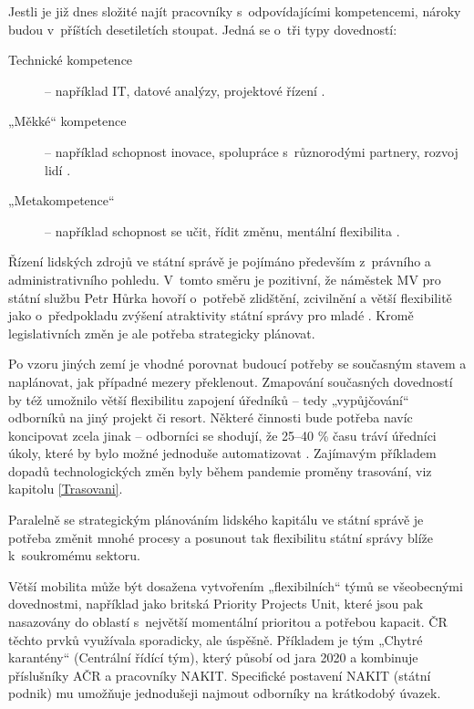 Jestli je již dnes složité najít pracovníky s~odpovídajícími kompetencemi, nároky budou v~příštích desetiletích stoupat. Jedná se o~tři typy dovedností:
\begin{description}
  \item[Technické kompetence] -- například IT, datové
analýzy, projektové řízení \cite{thomas_finding_2021, hlidac_nedigitalni_2021}.
  \item[„Měkké“ kompetence] -- například schopnost inovace, spolupráce
s~různorodými partnery, rozvoj lidí \cite{oecd_public_governance_reviews_skills_2020}.
  \item[„Metakompetence“] -- například schopnost se učit, řídit změnu, mentální flexibilita \cite{dondi_future-citizen_2020}.
\end{description}
Řízení lidských zdrojů ve státní správě je pojímáno především z~právního a administrativního pohledu. V~tomto směru je pozitivní, že náměstek MV pro státní službu Petr Hůrka \cite{plihalova_z_2020} hovoří o~potřebě zlidštění, zcivilnění a větší flexibilitě jako o~předpokladu zvýšení atraktivity státní správy pro mladé \cite{mpo2021}. Kromě legislativních změn je ale potřeba strategicky plánovat.

Po vzoru jiných zemí \cite{thomas_finding_2021, ministere_gestion_2015} je vhodné porovnat budoucí potřeby se současným stavem a naplánovat, jak případné mezery překlenout. Zmapování současných dovedností by též umožnilo větší flexibilitu zapojení úředníků -- tedy „vypůjčování“ odborníků na jiný projekt či resort. Některé činnosti bude potřeba navíc koncipovat zcela jinak -- odborníci se shodují, že 25--40 \% času tráví úředníci úkoly, které by bylo možné jednoduše automatizovat \cite{department_of_the_prime_minister_and_cabinet_our_2019, deloitte_augmented_2017}. Zajímavým příkladem dopadů technologických změn byly během pandemie proměny trasování, viz kapitolu \ref{Trasovani}.

Paralelně se strategickým plánováním lidského kapitálu ve státní správě je po\-tře\-ba změnit mnohé procesy a posunout tak flexibilitu státní správy blíže k~soukromému sektoru.

Větší mobilita může být dosažena vytvořením „flexibilních“ týmů se všeobecnými dovednostmi, například jako britská Priority Projects Unit, které jsou pak nasazovány do oblastí s~největší momentální prioritou a potřebou kapacit. ČR těchto prvků využívala sporadicky, ale úspěšně. Příkladem je tým „Chytré karantény“ (Centrální řídící tým), který působí od jara 2020 a kombinuje příslušníky AČR a pracovníky NAKIT. Specifické postavení NAKIT (státní podnik) mu umožňuje jednodušeji najmout odborníky na krátkodobý úvazek.

